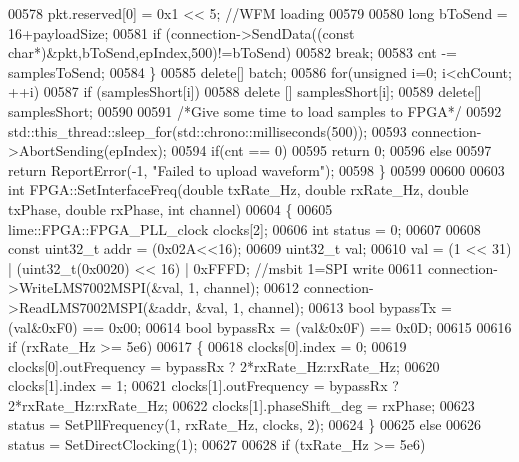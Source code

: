 \begin{DoxyCode}
{{{{{00578         pkt.reserved[0] = 0x1 << 5; \textcolor{comment}{//WFM loading}
00579 
00580         \textcolor{keywordtype}{long} bToSend = 16+payloadSize;
00581         \textcolor{keywordflow}{if} (connection->SendData((\textcolor{keyword}{const} \textcolor{keywordtype}{char}*)&pkt,bToSend,epIndex,500)!=bToSend)
00582             \textcolor{keywordflow}{break};
00583         cnt -= samplesToSend;
00584     \}
00585     \textcolor{keyword}{delete}[] batch;
00586     \textcolor{keywordflow}{for}(\textcolor{keywordtype}{unsigned} i=0; i<chCount; ++i)
00587         \textcolor{keywordflow}{if} (samplesShort[i])
00588             \textcolor{keyword}{delete} [] samplesShort[i];
00589     \textcolor{keyword}{delete}[] samplesShort;
00590 
00591     \textcolor{comment}{/*Give some time to load samples to FPGA*/}
00592     std::this\_thread::sleep\_for(std::chrono::milliseconds(500));
00593     connection->AbortSending(epIndex);
00594     \textcolor{keywordflow}{if}(cnt == 0)
00595         \textcolor{keywordflow}{return} 0;
00596     \textcolor{keywordflow}{else}
00597         \textcolor{keywordflow}{return} ReportError(-1, \textcolor{stringliteral}{"Failed to upload waveform"});
00598 \}
00599 
00600 
00603 \textcolor{keywordtype}{int} FPGA::SetInterfaceFreq(\textcolor{keywordtype}{double} txRate\_Hz, \textcolor{keywordtype}{double} rxRate\_Hz, \textcolor{keywordtype}{double} txPhase, \textcolor{keywordtype}{double} rxPhase, \textcolor{keywordtype}{int} channel)
00604 \{
00605     lime::FPGA::FPGA_PLL_clock clocks[2];
00606     \textcolor{keywordtype}{int} status = 0;
00607 
00608     \textcolor{keyword}{const} uint32\_t addr = (0x02A<<16);
00609     uint32\_t val;
00610     val = (1 << 31) | (uint32\_t(0x0020) << 16) | 0xFFFD; \textcolor{comment}{//msbit 1=SPI write}
00611     connection->WriteLMS7002MSPI(&val, 1, channel);
00612     connection->ReadLMS7002MSPI(&addr, &val, 1, channel);
00613     \textcolor{keywordtype}{bool} bypassTx = (val&0xF0) == 0x00;
00614     \textcolor{keywordtype}{bool} bypassRx = (val&0x0F) == 0x0D;
00615 
00616     \textcolor{keywordflow}{if}  (rxRate\_Hz >= 5e6)
00617     \{
00618         clocks[0].index = 0;
00619         clocks[0].outFrequency = bypassRx ? 2*rxRate\_Hz:rxRate\_Hz;
00620         clocks[1].index = 1;
00621         clocks[1].outFrequency = bypassRx ? 2*rxRate\_Hz:rxRate\_Hz;
00622         clocks[1].phaseShift_deg = rxPhase;
00623         status = SetPllFrequency(1, rxRate\_Hz, clocks, 2);
00624     \}
00625     \textcolor{keywordflow}{else}
00626         status = SetDirectClocking(1);
00627 
00628     \textcolor{keywordflow}{if} (txRate\_Hz >= 5e6)
}}}}}
\end{DoxyCode}
